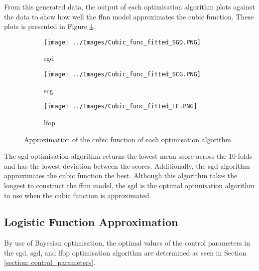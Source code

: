 \documentclass[10pt, conference]{IEEEtran}
\begin{document}
From this generated data, the output of each optimisation algorithm plots against
the data to show how well the \acrshort{ffnn} model approximates the cubic function.
These plots is presented in Figure \ref{fig:Cubic_approximation}.
\begin{figure}[H]
    \centering
    \begin{subfigure}[b]{0.23\textwidth}
        \centering
        \texttt{[image: ../Images/Cubic\_func\_fitted\_SGD.PNG]}
        \caption{\acrshort{sgd}}
        \label{fig:Cubic_func_SGD_approximation}
    \end{subfigure}
    \hfill
    \begin{subfigure}[b]{0.23\textwidth}
        \centering
        \texttt{[image: ../Images/Cubic\_func\_fitted\_SCG.PNG]}
        \caption{\acrshort{scg}}
        \label{fig:Cubic_func_SCG_approximation}
    \end{subfigure}
    \begin{subfigure}[b]{0.23\textwidth}
        \centering
        \texttt{[image: ../Images/Cubic\_func\_fitted\_LF.PNG]}
        \caption{\acrshort{lfop}}
        \label{fig:Cubic_func_LF_approximation}
    \end{subfigure}
    \caption{Approximation of the cubic function of each optimisation algorithm}
    \label{fig:Cubic_approximation}
\end{figure}

The \acrshort{sgd} optimisation algorithm returns the lowest mean score across the 10-folds and has
the lowest deviation between the scores. Additionally, the \acrshort{sgd} algorithm approximates the cubic
function the best. Although this algorithm takes the longest to construct the \acrshort{ffnn} model, the
\acrshort{sgd} is the optimal optimisation algorithm to use when the cubic function is approximated.

\subsection{Logistic Function Approximation}

By use of Bayesian optimisation, the optimal values of the control parameters in the
\acrshort{sgd}, \acrshort{sgd}, and \acrshort{lfop} optimisation algorithm are determined as seen in
Section \ref{section: control_parameters}.
\end{document}
